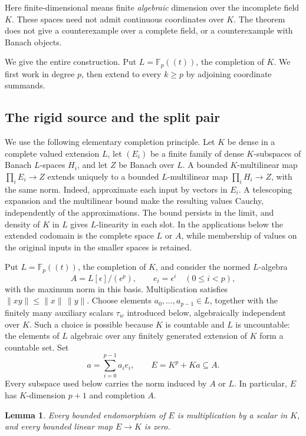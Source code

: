 \documentclass[11pt]{amsart}
\newtheorem{lemma}[theorem]{Lemma}
\theoremstyle{definition}
\theoremstyle{remark}
\numberwithin{equation}{section}
\newcommand{\F}{\mathbb F}
\newcommand{\norm}[1]{\lVert #1\rVert}
\begin{document}
Here finite-dimensional means finite \emph{algebraic} dimension over the incomplete field $K$. These spaces
need not admit continuous coordinates over $K$. The theorem does not give a counterexample over a complete
field, or a counterexample with Banach objects.


We give the entire construction. Put $L=\F_p((t))$, the completion of $K$.
We first work in degree $p$, then extend to every $k\ge p$ by adjoining coordinate summands.

\subsection{The rigid source and the split pair}

We use the following elementary completion principle. Let $K$ be dense in a complete valued extension $L$,
let $(E_i)$ be a finite family of dense $K$\nobreakdash-subspaces of Banach $L$\nobreakdash-spaces $H_i$,
and let $Z$ be Banach over $L$.
A bounded $K$\nobreakdash-multilinear map $\prod_iE_i\to Z$ extends uniquely to a bounded
$L$\nobreakdash-multilinear map $\prod_iH_i\to Z$, with the same norm. Indeed, approximate each input by
vectors in $E_i$. A telescoping expansion and the multilinear bound make the resulting values Cauchy,
independently of the approximations. The bound persists in the limit, and density of $K$ in $L$ gives
$L$\nobreakdash-linearity in each slot. In the applications below the extended codomain is the complete
space $L$ or $A$, while membership of values on the original inputs in the smaller spaces is retained.

Put $L=\F_p((t))$, the completion of $K$, and consider the normed $L$\nobreakdash-algebra
\[
A=L[\epsilon]/(\epsilon^p),\qquad e_i=\epsilon^i\quad(0\le i<p),
\]
with the maximum norm in this basis. Multiplication satisfies $\norm{xy}\le\norm x\,\norm y$.
Choose elements $a_0,\ldots,a_{p-1}\in L$, together with the finitely many auxiliary scalars
$\tau_w$ introduced below, algebraically independent over $K$. Such a choice is possible because $K$ is
countable and $L$ is uncountable: the elements of $L$ algebraic over any finitely generated extension of
$K$ form a countable set. Set
\[
a=\sum_{i=0}^{p-1}a_i e_i,\qquad E=K^p+Ka\subseteq A.
\]
Every subspace used below carries the norm induced by $A$ or $L$. In particular, $E$ has $K$\nobreakdash-dimension
$p+1$ and completion $A$.

\begin{lemma}\label{dom:rigid}
Every bounded endomorphism of $E$ is multiplication by a scalar in $K$, and every bounded linear map
$E\to K$ is zero.
\end{lemma}
\end{document}
